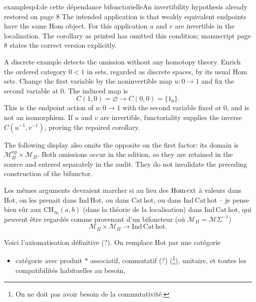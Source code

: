 \begin{dcomment}{examples}{p4:de cette dépendance bifonctorielle}{An invertibility hypothesis already restored on page 8}
The intended application is that weakly equivalent endpoints have the same Hom object. For this application $u$ and $v$ are invertible in the localization. The corollary as printed has omitted this condition; manuscript page 8 states the correct version explicitly.

A discrete example detects the omission without any homotopy theory. Enrich the ordered category $0<1$ in sets, regarded as discrete spaces, by its usual Hom sets. Change the first variable by the noninvertible map $u:0\to1$ and fix the second variable at $0$. The induced map is
\[
 C(1,0)=\varnothing\longrightarrow C(0,0)=\{1_0\}.
\]
This is the endpoint action of $u:0\to1$ with the second variable fixed at $0$, and is not an isomorphism. If $u$ and $v$ are invertible, functoriality supplies the inverse $C(u^{-1},v^{-1})$, proving the repaired corollary.

The following display also omits the opposite on the first factor: its domain is $\mathcal M_\Pi^{\mathrm{op}}\times\mathcal M_\Pi$. Both omissions occur in the edition, so they are retained in the source and entered separately in the audit. They do not invalidate the preceding construction of the bifunctor.
\end{dcomment}


Les mêmes arguments devraient marcher si au lieu des $\mathrm{Hom}\,\mathrm{ext}$ à valeurs dans Hot, on les prenait dans Ind\,Hot, ou dans Cat\,hot, ou dans Ind\,Cat\,hot -- je pense bien sûr aux $\mathrm{CH}_\infty(a,b)$ (dans la théorie de la localisation) dans Ind\,Cat\,hot, qui peuvent être regardés comme provenant d'un bifoncteur (où $\mathcal{M}_\Pi = \mathcal{M}\Sigma^{-1}$)
\[
\mathcal{M}_\Pi \times \mathcal{M}_\Pi \longrightarrow \mathrm{Ind}\,\mathrm{Cat}\,\mathrm{hot}.
\]

Voici l'axiomatisation définitive (?). On remplace Hot par une catégorie

\begin{itemize}[label={$\mathcal{H}$,}]
\item catégorie avec produit $*$ associatif, commutatif (?) (\footnote{On ne doit pas avoir besoin de la commutativité.}), unitaire, et toutes les compatibilités habituelles au besoin,
\end{itemize}


